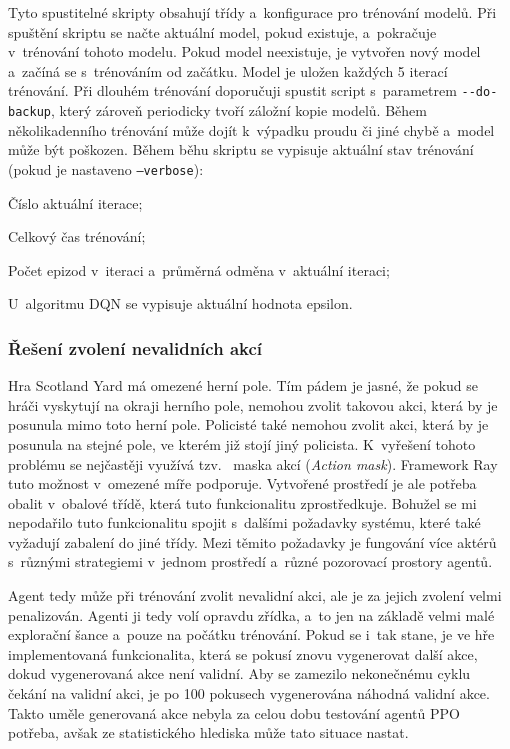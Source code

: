 Tyto spustitelné skripty obsahují třídy a~konfigurace pro trénování modelů.
Při spuštění skriptu se načte aktuální model, pokud existuje, a~pokračuje v~trénování tohoto modelu.
Pokud model neexistuje, je vytvořen nový model a~začíná se s~trénováním od začátku.
Model je uložen každých 5 iterací trénování.
Při dlouhém trénování doporučuji spustit script s~parametrem \texttt{-{}-do-backup}, který zároveň periodicky tvoří záložní kopie modelů.
Během několikadenního trénování může dojít k~výpadku proudu či jiné chybě a~model může být poškozen.
Během běhu skriptu se vypisuje aktuální stav trénování (pokud je nastaveno \texttt{--verbose}):
\begin{myitemize}
  \item Číslo aktuální iterace;
  \item Celkový čas trénování;
  \item Počet epizod v~iteraci a~průměrná odměna v~aktuální iteraci;
  \item U~algoritmu DQN se vypisuje aktuální hodnota epsilon.
\end{myitemize}

\subsubsection*{Řešení zvolení nevalidních akcí}
\label{subsubsec:nevalidni_akce}

Hra Scotland Yard má omezené herní pole.
Tím pádem je jasné, že pokud se hráči vyskytují na okraji herního pole, nemohou zvolit takovou akci, která by je posunula mimo toto herní pole.
Policisté také nemohou zvolit akci, která by je posunula na stejné pole, ve kterém již stojí jiný policista.
K~vyřešení tohoto problému se nejčastěji využívá tzv.~ maska akcí (\emph{Action mask}).
Framework Ray tuto možnost v~omezené míře podporuje.
Vytvořené prostředí je ale potřeba obalit v~obalové třídě, která tuto funkcionalitu zprostředkuje.
Bohužel se mi nepodařilo tuto funkcionalitu spojit s~dalšími požadavky systému, které také vyžadují zabalení do jiné třídy.
Mezi těmito požadavky je fungování více aktérů s~různými strategiemi v~jednom prostředí a~různé pozorovací prostory agentů.

Agent tedy může při trénování zvolit nevalidní akci, ale je za jejich zvolení velmi penalizován.
Agenti ji tedy volí opravdu zřídka, a~to jen na základě velmi malé explorační šance a~pouze na počátku trénování.
Pokud se i~tak stane, je ve hře implementovaná funkcionalita, která se pokusí znovu vygenerovat další akce, dokud vygenerovaná akce není validní.
Aby se zamezilo nekonečnému cyklu čekání na validní akci, je po 100 pokusech vygenerována náhodná validní akce.
Takto uměle generovaná akce nebyla za celou dobu testování agentů PPO potřeba, avšak ze statistického hlediska může tato situace nastat.

